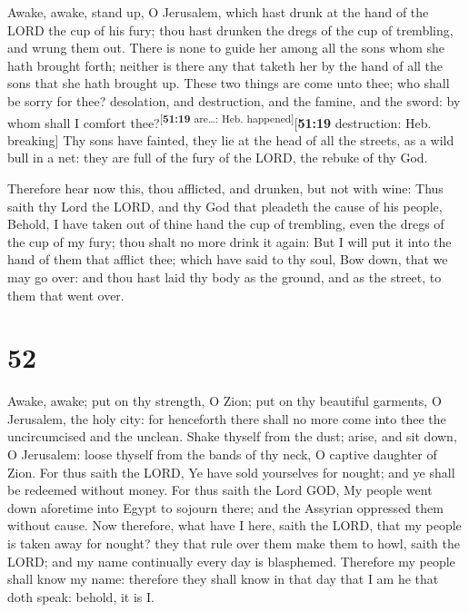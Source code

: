  Awake, awake, stand up, O Jerusalem, which hast drunk at
the hand of the LORD the cup of his fury; thou hast drunken the dregs of
the cup of trembling, and wrung them out.  There is none
to guide her among all the sons whom she hath brought forth; neither is
there any that taketh her by the hand of all the sons that she hath
brought up.  These two things are come unto thee; who
shall be sorry for thee? desolation, and destruction, and the famine,
and the sword: by whom shall I comfort
thee?\textsuperscript{{[}\textbf{51:19} are\ldots: Heb.
happened{]}}{[}\textbf{51:19} destruction: Heb. breaking{]}
 Thy sons have fainted, they lie at the head of all the
streets, as a wild bull in a net: they are full of the fury of the LORD,
the rebuke of thy God.

 Therefore hear now this, thou afflicted, and drunken,
but not with wine:  Thus saith thy Lord the LORD, and thy
God that pleadeth the cause of his people, Behold, I have taken out of
thine hand the cup of trembling, even the dregs of the cup of my fury;
thou shalt no more drink it again:  But I will put it
into the hand of them that afflict thee; which have said to thy soul,
Bow down, that we may go over: and thou hast laid thy body as the
ground, and as the street, to them that went over.

\hypertarget{section-51}{%
\section{52}\label{section-51}}

 Awake, awake; put on thy strength, O Zion; put on thy
beautiful garments, O Jerusalem, the holy city: for henceforth there
shall no more come into thee the uncircumcised and the unclean.
 Shake thyself from the dust; arise, and sit down, O
Jerusalem: loose thyself from the bands of thy neck, O captive daughter
of Zion.  For thus saith the LORD, Ye have sold yourselves
for nought; and ye shall be redeemed without money.  For
thus saith the Lord GOD, My people went down aforetime into Egypt to
sojourn there; and the Assyrian oppressed them without cause.
 Now therefore, what have I here, saith the LORD, that my
people is taken away for nought? they that rule over them make them to
howl, saith the LORD; and my name continually every day is blasphemed.
 Therefore my people shall know my name: therefore they
shall know in that day that I am he that doth speak: behold, it is I.

